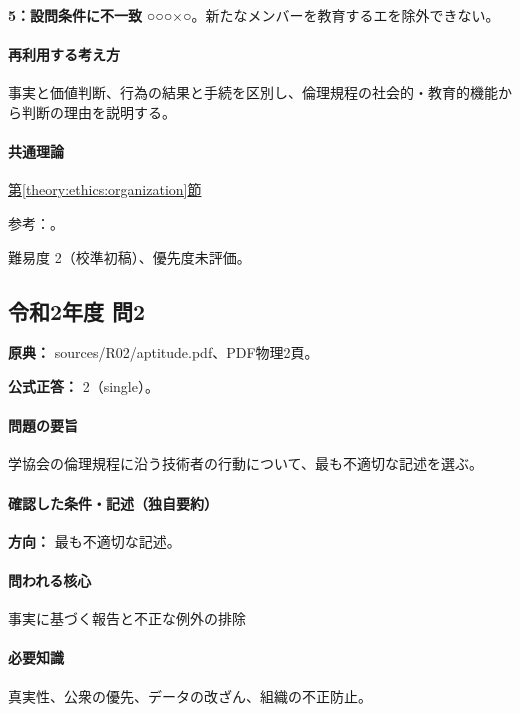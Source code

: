 \noindent\textbf{5：設問条件に不一致} ○○○×○。新たなメンバーを教育するエを除外できない。\par

\paragraph{再利用する考え方} 事実と価値判断、行為の結果と手続を区別し、倫理規程の社会的・教育的機能から判断の理由を説明する。

\paragraph{共通理論} \hyperref[theory:ethics:organization]{第\ref*{theory:ethics:organization}節}

\par 参考：\cite{fudano_ethics2021}。

\par 難易度 2（校準初稿）、優先度未評価。

\subsection{令和2年度 問2}
\label{q:r02-reg-apt-02}

\noindent\textbf{原典：} sources/R02/aptitude.pdf、PDF物理2頁。

\textbf{公式正答：} 2（single）。

\paragraph{問題の要旨} 学協会の倫理規程に沿う技術者の行動について、最も不適切な記述を選ぶ。

\paragraph{確認した条件・記述（独自要約）}\mbox{}\par

\noindent\textbf{方向：} 最も不適切な記述。\par

\paragraph{問われる核心} 事実に基づく報告と不正な例外の排除

\paragraph{必要知識} 真実性、公衆の優先、データの改ざん、組織の不正防止。

